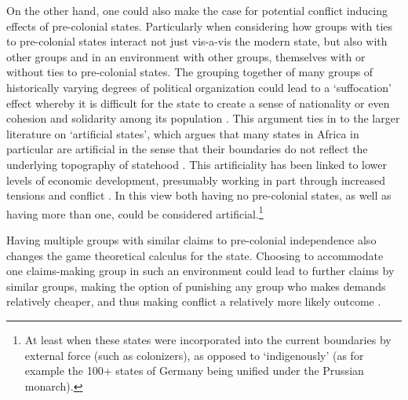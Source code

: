 \documentclass[12pt]{article}
\begin{document}
On the other hand, one could also make the case for potential conflict
inducing effects of pre-colonial states. Particularly when considering how
groups with ties to pre-colonial states interact not just vis-a-vis the modern
state, but also with other groups and in an environment with other groups,
themselves with or without ties to pre-colonial states. The grouping together of
many groups of historically varying degrees of political organization could lead
to a `suffocation' effect whereby it is difficult for the state to create a
sense of nationality or even cohesion and solidarity among its population
\citep{Englebert2002}. This argument ties in to the larger literature on
`artificial states', which argues that many states in Africa in particular are
artificial in the sense that their boundaries do not reflect the underlying
topography of statehood \citep{Alesina2011}. This artificiality has been linked
to lower levels of economic development, presumably working in part through
increased tensions and conflict \citep{Alesina2011}. In this view both having no
pre-colonial states, as well as having more than one, could be considered
artificial.\footnote{At least when these states were incorporated into the
current boundaries by external force (such as colonizers), as opposed to
`indigenously' (as for example the 100+ states of Germany being unified under
the Prussian monarch).}

Having multiple groups with similar claims to pre-colonial independence also
changes the game theoretical calculus for the state. Choosing to accommodate one
claims-making group in such an environment could lead to further claims by
similar groups, making the option of punishing any group who makes demands
relatively cheaper, and thus making conflict a relatively more likely outcome
\citep{Wishman}.
\end{document}
